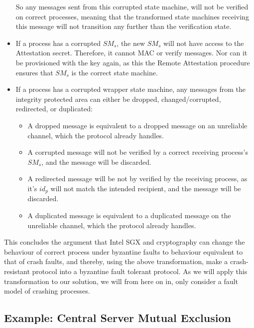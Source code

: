 \documentclass{article}
\begin{document}
\begin{itemize}
		So any messages sent from this corrupted state machine, will not be verified on correct processes, meaning that the transformed state machines receiving this message will not transition any further than the verification state.
		\item If a process has a corrupted $SM_s$, the new $SM_s$ will not have access to the Attestation secret.
		Therefore, it cannot MAC or verify messages.
		Nor can it be provisioned with the key again, as this the Remote Attestation procedure ensures that $SM_s$ is the correct state machine.
		\item If a process has a corrupted wrapper state machine, any messages from the integrity protected area can either be dropped, changed/corrupted, redirected, or duplicated:
		\begin{itemize}
			\item A dropped message is equivalent to a dropped message on an unreliable channel, which the protocol already handles.
			\item A corrupted message will not be verified by a correct receiving process's $SM_s$, and the message will be discarded.
			\item A redirected message will be not by verified by the receiving process, as it's $id_p$ will not match the intended recipient, and the message will be discarded.
			\item A duplicated message is equivalent to a duplicated message on the unreliable channel, which the protocol already handles.
		\end{itemize}
	\end{itemize}

	This concludes the argument that Intel SGX and cryptography can change the behaviour of correct process under byzantine faults to behaviour equivalent to that of crash faults, and thereby, using the above transformation, make a crash-resistant protocol into a byzantine fault tolerant protocol.
	As we will apply this transformation to our solution, we will from here on in, only consider a fault model of crashing processes.

		\subsection{Example: Central Server Mutual Exclusion}
\end{document}
